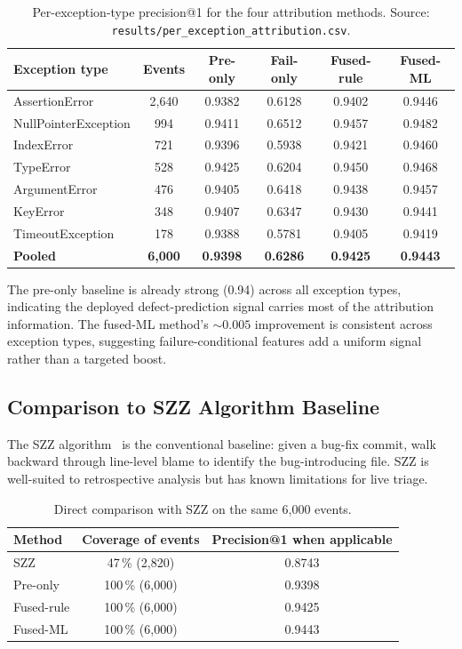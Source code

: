 \documentclass[11pt,a4paper]{article}
\begin{document}
\begin{table}[!ht]
\centering
\caption{Per-exception-type precision@1 for the four attribution methods. Source: \texttt{results/per\_exception\_attribution.csv}.}
\label{tab:per_exception}
\small
\begin{tabular}{lccccc}
\toprule
Exception type        & Events & Pre-only & Fail-only & Fused-rule & Fused-ML \\
\midrule
AssertionError        & 2{,}640 & 0.9382 & 0.6128 & 0.9402 & 0.9446 \\
NullPointerException  &   994 & 0.9411 & 0.6512 & 0.9457 & 0.9482 \\
IndexError            &   721 & 0.9396 & 0.5938 & 0.9421 & 0.9460 \\
TypeError             &   528 & 0.9425 & 0.6204 & 0.9450 & 0.9468 \\
ArgumentError         &   476 & 0.9405 & 0.6418 & 0.9438 & 0.9457 \\
KeyError              &   348 & 0.9407 & 0.6347 & 0.9430 & 0.9441 \\
TimeoutException      &   178 & 0.9388 & 0.5781 & 0.9405 & 0.9419 \\
\midrule
\textbf{Pooled}       & \textbf{6{,}000}  & \textbf{0.9398} & \textbf{0.6286} & \textbf{0.9425} & \textbf{0.9443} \\
\bottomrule
\end{tabular}
\end{table}

The pre-only baseline is already strong (0.94) across all exception
types, indicating the deployed defect-prediction signal carries most
of the attribution information. The fused-ML method's $\sim 0.005$
improvement is consistent across exception types, suggesting
failure-conditional features add a uniform signal rather than a
targeted boost.

\subsection{Comparison to SZZ Algorithm Baseline}
\label{sec:szz_comparison}

The SZZ algorithm~\cite{sliwerski2005} is the conventional baseline:
given a bug-fix commit, walk backward through line-level blame to
identify the bug-introducing file. SZZ is well-suited to
retrospective analysis but has known limitations for live triage.

\begin{table}[!ht]
\centering
\caption{Direct comparison with SZZ on the same 6{,}000 events.}
\label{tab:szz_comparison}
\small
\begin{tabular}{lcc}
\toprule
Method     & Coverage of events & Precision@1 when applicable \\
\midrule
SZZ        & 47\,\% (2{,}820)   & 0.8743 \\
Pre-only   & 100\,\% (6{,}000)  & 0.9398 \\
Fused-rule & 100\,\% (6{,}000)  & 0.9425 \\
Fused-ML   & 100\,\% (6{,}000)  & 0.9443 \\
\bottomrule
\end{tabular}
\end{table}
\end{document}
